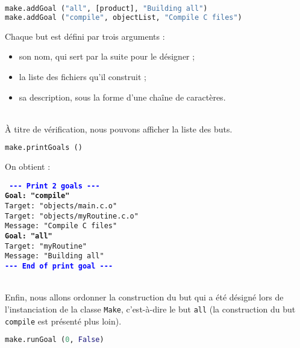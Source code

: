 \documentclass[a4paper,11pt]{extarticle}
\begin{document}
\begin{lstlisting}[language=py]
make.addGoal ("all", [product], "Building all")
make.addGoal ("compile", objectList, "Compile C files")
\end{lstlisting}
Chaque but est défini par trois arguments :
\begin{itemize}
\item son nom, qui sert par la suite pour le désigner ;
\item la liste des fichiers qu'il construit ;
\item sa description, sous la forme d'une chaîne de caractères.
\end{itemize}

~\\À titre de vérification, nous pouvons afficher la liste des buts.
\begin{lstlisting}[language=py]
make.printGoals ()
\end{lstlisting}

On obtient :

\begin{mdframed}[hidealllines=true,backgroundcolor=lightgray!20]
\tt\footnotesize
\textcolor{blue}{\bf{-}{-}{-} Print 2 goals {-}{-}{-}}\\
\textcolor{OliveGreen}{\bf Goal: "compile"}\\
\hspace*{1.2em}Target: "objects/main.c.o"\\
\hspace*{1.2em}Target: "objects/myRoutine.c.o"\\
\hspace*{1.2em}Message: "Compile C files"\\
\textcolor{OliveGreen}{\bf Goal: "all"}\\
\hspace*{1.2em}Target: "myRoutine"\\
\hspace*{1.2em}Message: "Building all"\\
\textcolor{blue}{\bf{-}{-}{-} End of print goal {-}{-}{-}}
\end{mdframed}

~\\Enfin, nous allons ordonner la construction du but qui a été désigné lors de l'instanciation de la classe \texttt{Make}, c'est-à-dire le but \texttt{all} (la construction du but \texttt{compile} est présenté plus loin).

\begin{lstlisting}[language=py]
make.runGoal (0, False)
\end{lstlisting}
\end{document}
